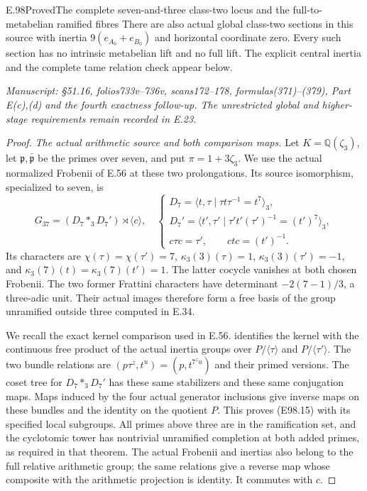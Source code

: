 \begin{statement}{E.98}{Proved}{The complete seven-and-three class-two locus and the full-to-metabelian ramified fibres}
There are also actual global class-two sections in this
source with inertia $9(e_{A_0}+e_{B_0})$ and horizontal
coordinate zero. Every such section has no intrinsic
metabelian lift and no full lift. The explicit central
inertia and the complete tame relation check appear below.

\emph{Manuscript: \S51.16, folios733v--736v, scans172--178,
formulas(371)--(379), Part E(c),(d) and the fourth exactness
follow-up. The unrestricted global and higher-stage
requirements remain recorded in E.23.}
\end{statement}
\begin{proof}
\emph{The actual arithmetic source and both comparison maps.}
Let $K=\mathbb Q(\zeta_3)$, let $\mathfrak p,\bar{\mathfrak p}$
be the primes over seven, and put $\pi=1+3\zeta_3$.
We use the actual normalized Frobenii of E.56 at these
two prolongations. Its source isomorphism, specialized
to seven, is
\[
 G_{37}=\left(D_7\mathop{\ast}_3D_7'\right)
                                    \rtimes\langle c\rangle,
 \quad
 \begin{cases}
 D_7=\langle t,\tau\mid\tau t\tau^{-1}=t^7\rangle_3,\\
 D_7'=\langle t',\tau'\mid\tau't'(\tau')^{-1}=(t')^7\rangle_3,\\
 c\tau c=\tau',\qquad ctc=(t')^{-1}.
 \end{cases}
 \tag{E98.15}
\]
Its characters are $\chi(\tau)=\chi(\tau')=7$,
$\kappa_3(3)(\tau)=1$, $\kappa_3(3)(\tau')=-1$,
and $\kappa_3(7)(t)=\kappa_3(7)(t')=1$.
The latter cocycle vanishes at both chosen Frobenii.
The two former Frattini characters have determinant
$-2(7-1)/3$, a three-adic unit. Their actual images
therefore form a free basis of the group unramified
outside three computed in E.34.

We recall the exact kernel comparison used in E.56.
\cite[Theorem2.4, its proof and the remark after
Proposition2.1]{E_WingbergRiemann} identifies the kernel
with the continuous free product of the actual inertia
groups over $P/\langle\tau\rangle$ and
$P/\langle\tau'\rangle$. The two bundle relations are
$(p\tau^z,t^u)=(p,t^{7^zu})$ and their primed versions.
The coset tree for $D_7\ast_3D_7'$ has these same
stabilizers and these same conjugation maps. Maps
induced by the four actual generator inclusions give
inverse maps on these bundles and the identity on
the quotient $P$. This proves (E98.15) with its specified
local subgroups. All primes above three are in the
ramification set, and the cyclotomic tower has nontrivial
unramified completion at both added primes, as required
in that theorem. The actual Frobenii and inertias also
belong to the full relative arithmetic group; the same
relations give a reverse map whose composite with the
arithmetic projection is identity. It commutes with $c$.


\end{proof}
